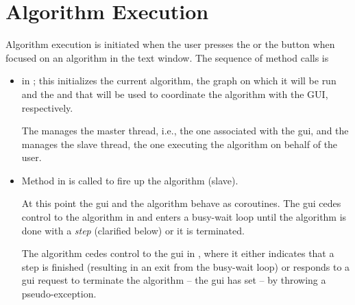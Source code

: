 \section{Algorithm Execution} \label{sec:execution}

Algorithm execution is initiated when the user presses the  or
the  button when focused on an algorithm in the text
window. The sequence of method calls is
\begin{itemize}
\item {} in ; this
  initializes the current algorithm, the graph on which it will be run and
  the  and  that will be
  used to coordinate the algorithm with the GUI, respectively.

  The  manages the master thread, i.e., the one
  associated with the gui, and the  manages the
  slave thread, the one executing the algorithm on behalf of the user.

\item Method  in 
  is called to fire up the algorithm (slave).

  At this point the gui and the algorithm behave as coroutines. The gui cedes
  control to the algorithm in
   and enters a
  busy-wait loop until the algorithm is done with a \emph{step} (clarified
  below) or it is terminated.

  The algorithm cedes control to the gui in
  , where it either
  indicates that a step is finished (resulting in an exit from the busy-wait
  loop) or responds to a gui request to terminate
  the algorithm -- the gui has set  -- by throwing a
   pseudo-exception.
\end{itemize}

